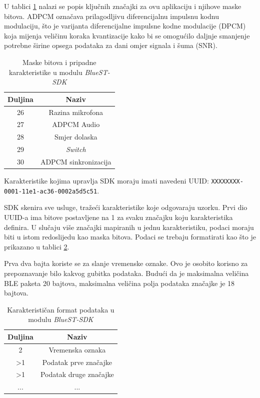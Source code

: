 U tablici \ref{table:masks} nalazi se popis ključnih značajki za ovu aplikaciju i njihove maske bitova. ADPCM označava prilagodljivu diferencijalnu impulsnu kodnu modulaciju, što je varijanta diferencijalne impulsne kodne modulacije (DPCM) koja mijenja veličinu koraka kvantizacije kako bi se omogućilo daljnje smanjenje potrebne širine opsega podataka za dani omjer signala i šuma (SNR). 

\begin{table}[ht!]
	\centering
	\caption{Maske bitova i pripadne karakteristike u modulu \textit{BlueST-SDK} \cite{bluest}}
	\begin{tabular}{|c| c|}
		\hline
		\rowcolor{lightblue}  
		\textbf{Duljina} & \textbf{Naziv}  \\ \hline
		26 & Razina mikrofona \\ \hline
		27 & ADPCM Audio \\ \hline
		28 & Smjer dolaska \\ \hline
		29 & \textit{Switch} \\ \hline
		30 & ADPCM sinkronizacija  \\ \hline
	\end{tabular}
	\label{table:masks}
\end{table}

Karakteristike kojima upravlja SDK moraju imati navedeni UUID:
\newline \texttt{XXXXXXXX-0001-11e1-ac36-0002a5d5c51}. 

SDK skenira sve usluge, tražeći karakteristike koje odgovaraju uzorku. Prvi dio UUID-a ima bitove postavljene na 1 za svaku značajku koju karakteristika definira. U slučaju više značajki mapiranih u jednu karakteristiku, podaci moraju biti u istom redoslijedu kao maska bitova. Podaci se trebaju formatirati kao što je prikazano u tablici \ref{table:data_format}.

Prva dva bajta koriste se za slanje vremenske oznake. Ovo je osobito korisno za prepoznavanje bilo kakvog gubitka podataka. Budući da je maksimalna veličina BLE paketa 20 bajtova, maksimalna veličina polja podataka značajke je 18 bajtova.

\begin{table}[ht!]
	\centering
	\caption{Karakterističan format podataka u modulu \textit{BlueST-SDK} \cite{bluest}}
	\begin{tabular}{|c| c|}
		\hline
		\rowcolor{lightblue}  
		\textbf{Duljina} & \textbf{Naziv}  \\ \hline
		2 &  Vremenska oznaka \\ \hline
		>1 & Podatak prve značajke \\ \hline
		>1 & Podatak druge značajke \\ \hline
		... & ... \\ \hline
	\end{tabular}
	\label{table:data_format}
\end{table}

